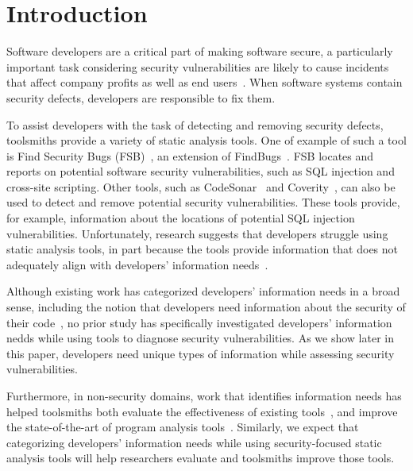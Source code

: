 \documentclass{acm_proc_article-sp}
\begin{document}
\section{Introduction}

Software developers are a critical part of making software secure, a particularly important task considering security vulnerabilities are likely to cause incidents that affect company profits as well as end users~\cite{chen2002mops}.
When software systems contain security defects, developers are responsible to fix them. 

To assist developers with the task of detecting and removing security defects, toolsmiths provide a variety of static analysis tools.
One of example of such a tool is Find Security Bugs (FSB)~\cite{FindSecurityBugs}, an extension of FindBugs~\cite{FindBugs}.
FSB locates and reports on potential software security vulnerabilities, such as SQL injection and cross-site scripting.  
Other tools, such as CodeSonar~\cite{CodeSonar} and Coverity~\cite{Coverity}, can also be used to detect and remove potential security vulnerabilities.
These tools provide, for example, information about the locations of potential SQL injection vulnerabilities.
Unfortunately, research suggests that developers struggle using static analysis tools, in part because the tools provide information that does not adequately align with developers' information needs~\cite{johnson2013don}. 


Although existing work has categorized developers' information needs in a broad sense, including the notion that developers need information about the security of their code~\cite{latoza2010hard}, no prior study has specifically investigated developers' information nedds while using tools to diagnose security vulnerabilities. 
As we show later in this paper, developers need unique types of information while assessing security vulnerabilities.

Furthermore, in non-security domains, work that identifies information needs has helped toolsmiths both evaluate the effectiveness of existing tools~\cite{ammar2012empirical}, and improve the state-of-the-art of program analysis tools~\cite{kononenko2012automatically, servant2012history, yoon2013visualization}. 
Similarly, we expect that categorizing developers' information needs while using security-focused static analysis tools will help researchers evaluate and toolsmiths improve those tools. 
\end{document}
